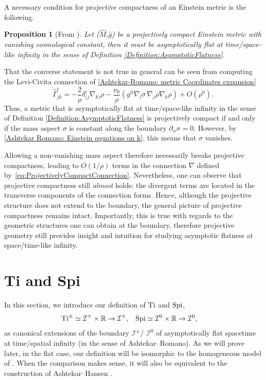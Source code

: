 \documentclass[a4paper, 10pt]{article}
\newtheorem{proposition}{Proposition}[section]
\theoremstyle{remark}
\newcommand{\Ti}{\textnormal{Ti}}
\newcommand{\Spi}{\textnormal{Spi}}
\begin{document}
A necessary condition for projective compactness of an Einstein metric is the following.
\begin{proposition}[{From \cite{Cap:2014aa,Cap:2014ab}}]
  Let ($\hat{M}$,$\hat{g}$) be a projectively compact Einstein metric with vanishing cosmological constant, then it must be asymptotically flat at time/space-like infinity in the sense of Definition \ref{Definition:AsymptoticFlatness}.
\end{proposition}
That the converse statement is not true in general can be seen from computing the Levi-Civita connection of \eqref{Ashtekar-Romano: metric Coordinates expansion}
\begin{equation}
    \hat\Gamma^{i}_{jk} = - \frac{2}{\rho}\delta^i_{(j}\nabla_{k)}\rho - \frac{\nu_0}{\rho} \left( g^{il}\nabla_l  \sigma\, \nabla_j\rho \nabla_k \rho \right)  + O(\rho^0).
\end{equation}
Thus, a metric that is asymptotically flat at time/space-like infinity in the sense of Definition \ref{Definition:AsymptoticFlatness} is projectively compact if and only if the mass aspect $\sigma$ is constant along the boundary $\partial_{\alpha}\sigma=0$. However, by \eqref{Ashtekar Romano: Einstein equations on k}, this means that $\sigma$ vanishes.

 Allowing a non-vanishing mass aspect therefore necessarily breaks projective compactness, leading to $O(1/\rho)$ terms in the connection $\nabla$ defined by~\eqref{eq:ProjectivelyCompactConnection}. Nevertheless, one can observe that projective compactness still \emph{almost} holds:  the divergent terms are located in the transverse components of the connection forms. Hence, although the projective structure does not extend to the boundary, the general picture of projective compactness remains intact. Importantly, this is true with regards to the geometric structures one can obtain at the boundary, therefore projective geometry still provides insight and intuition for studying asymptotic flatness at space/time-like infinity.


 \newpage
\section{Ti and Spi}\label{Section: Ti and Spi}

In this section, we introduce our definition of $\Ti$ and $\Spi$,
\begin{align}
    \Ti^{\pm} \simeq \mathcal{I}^{\pm} \times \mathbb{R} &\to \mathcal{I}^{\pm}, & \Spi \simeq \mathcal{I}^{0} \times \mathbb{R} &\to \mathcal{I}^{0},
\end{align}
as canonical extensions of the boundary $\mathcal{I}^{\pm}$/ $\mathcal{I}^{0}$ of asymptotically flat spacetime at time/spatial infinity (in the sense of Ashtekar--Romano). As we will prove later, in the flat case, our definition will be isomorphic to the homogeneous model of \cite{Figueroa-OFarrill:2021sxz}.  When the comparison makes sense, it will also be equivalent to the construction of Ashtekar--Hansen \cite{ashtekar_unified_1978}.
\end{document}
